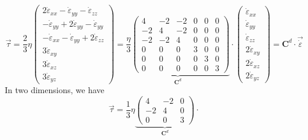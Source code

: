 \begin{equation}
\vec \tau  
= \frac{2}{3} \eta
\left(
\begin{array}{c}
2\dot\varepsilon_{xx} -\dot\varepsilon_{yy} -\dot\varepsilon_{zz} \\ 
-\dot\varepsilon_{yy} +2\dot\varepsilon_{yy} -\dot\varepsilon_{yy} \\ 
-\dot\varepsilon_{xx} -\dot\varepsilon_{yy} +2\dot\varepsilon_{zz} \\
3\dot\varepsilon_{xy} \\
3\dot\varepsilon_{xz} \\
3\dot\varepsilon_{yz} 
\end{array}
\right)
=
\underbrace{
\frac{\eta}{3}
\left(
\begin{array}{cccccc}
4 & -2& -2& 0& 0& 0\\
-2 & 4& -2& 0& 0& 0\\
-2 & -2& 4& 0& 0& 0\\
0 &0 &0 & 3& 0& 0\\
0 &0 &0 & 0& 3& 0\\
0 &0 &0 & 0& 0& 3 
\end{array}
\right)
}_{{\bm C}^d}
\cdot
\left(
\begin{array}{c}
\dot\varepsilon_{xx} \\
\dot\varepsilon_{yy} \\
\dot\varepsilon_{zz} \\
2\dot\varepsilon_{xy} \\
2\dot\varepsilon_{xz} \\
2\dot\varepsilon_{yz} 
\end{array}
\right)
=
{\bm C}^d \cdot \vec{\dot \varepsilon}
\end{equation}
In two dimensions, we have
\[
\vec\tau=\frac{1}{3}\eta 
\underbrace{
\left(
\begin{array}{ccc}
4 & -2 & 0 \\
-2 & 4 & 0 \\
0 &0 &  3 
\end{array}
\right)
}_{{\bm C}^d}
\cdot
\]


